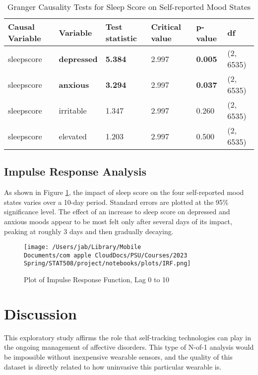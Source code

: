 \documentclass{article}
\begin{document}
\begin{table}[h]
    \centering
    \begin{tabular}{llllll}
    \toprule
        \textbf{Causal Variable} & \textbf{Variable} & \textbf{Test statistic} & \textbf{Critical value} & \textbf{p-value} & \textbf{df} \\
        \midrule
        sleepscore & \textbf{depressed} & \textbf{5.384} & 2.997 & \textbf{0.005} & (2, 6535) \\
        sleepscore & \textbf{anxious} & \textbf{3.294} & 2.997 & \textbf{0.037} & (2, 6535) \\
        sleepscore & irritable & 1.347 & 2.997 & 0.260 & (2, 6535) \\
        sleepscore & elevated & 1.203 & 2.997 & 0.500 & (2, 6535) \\
      \bottomrule
    \end{tabular}
    \caption{Granger Causality Tests for Sleep Score on Self-reported Mood
    States}
    \label{Granger}
\end{table}


\hypertarget{impulse-response-analysis-1}{%
\subsection{Impulse Response Analysis}\label{impulse-response-analysis-1}}

As shown in Figure \ref{IRF}, the impact of sleep score on the four
self-reported mood states varies over a 10-day period. Standard errors are
plotted at the 95\% significance level. The effect of an increase to sleep score
on depressed and anxious moods appear to be most felt only after several days of
its impact, peaking at roughly 3 days and then gradually decaying.

\begin{figure}[hb]
\centering
  \texttt{[image: /Users/jab/Library/Mobile Documents/com~apple~CloudDocs/PSU/Courses/2023 Spring/STAT508/project/notebooks/plots/IRF.png]}
  \caption{Plot of Impulse Response Function, Lag 0 to 10}
  \label{IRF}
\end{figure}



\hypertarget{discussion}{%
\section{Discussion}\label{discussion}}

This exploratory study affirms the role that self-tracking technologies can play
in the ongoing management of affective disorders. This type of N-of-1 analysis
would be impossible without inexpensive wearable sensors, and the quality of
this dataset is directly related to how uninvasive this particular wearable is.
\end{document}
